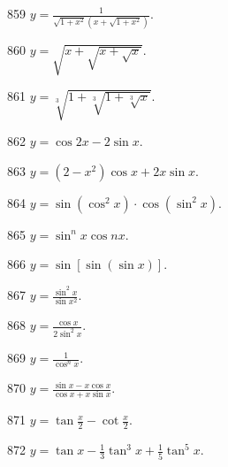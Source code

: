 \begin{prob}[S]{859}
$y = \frac{1}{\sqrt{1 + x^2}(x + \sqrt{1 + x^2})}$.
\end{prob}

\begin{prob}[S]{860}
$y = \sqrt{x + \sqrt{x + \sqrt{x}}}$.
\end{prob}

\begin{prob}[S]{861}
$y = \sqrt[3]{1 + \sqrt[3]{1 + \sqrt[3]{x}}}$.
\end{prob}

\begin{prob}[S]{862}
$y = \cos 2x - 2\sin x$.
\end{prob}

\begin{prob}[S]{863}
$y = (2 - x^2)\cos x + 2x\sin x$.
\end{prob}

\begin{prob}[S]{864}
$y = \sin(\cos^2 x)\cdot\cos(\sin^2 x)$.
\end{prob}

\begin{prob}[S]{865}
$y = \sin^n x \cos nx$.
\end{prob}

\begin{prob}[S]{866}
$y = \sin[\sin(\sin x)]$.
\end{prob}

\begin{prob}[S]{867}
$y = \frac{\sin^2 x}{\sin x^2}$.
\end{prob}

\begin{prob}[S]{868}
$y = \frac{\cos x}{2\sin^2 x}$.
\end{prob}

\begin{prob}[S]{869}
$y = \frac{1}{\cos^n x}$.
\end{prob}

\begin{prob}[S]{870}
$y = \frac{\sin x - x\cos x}{\cos x + x\sin x}$.
\end{prob}

\begin{prob}[S]{871}
$y = \tan\frac{x}{2} - \cot\frac{x}{2}$.
\end{prob}

\begin{prob}[S]{872}
$y = \tan x - \frac{1}{3}\tan^3 x + \frac{1}{5}\tan^5 x$.
\end{prob}

